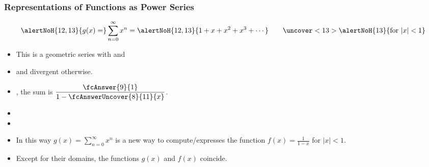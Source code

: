 \begin{frame}
\frametitle{Representations of Functions as Power Series}
\[ \alertNoH{12,13}{g(x)=} \sum_{n=0}^\infty x^n =\alertNoH{12,13}{ 1 + x + x^2 + x^3 + \cdots }\quad \quad  \uncover<13>{\alertNoH{13}{ \text{for } |x|<1}}
\]
\begin{itemize}
\item<2->  This is a geometric series with  and 
\item<6->   and divergent otherwise.
\item<8->  , the sum is $\displaystyle  \frac{ \fcAnswer{9}{ 1} }{1 - \fcAnswerUncover{8}{11}{x}} $.
\item<12->   
\item<14->  


\item<16->  In this way $g(x)=\sum\limits_{n=0}^\infty x^n$ is a new way to compute/expresses the function $\displaystyle f(x) = \frac{1}{1-x}$ for $|x|<1$.
\item<17-> Except for their domains, the functions $g(x)$ and $f(x)$ coincide.  
\end{itemize}
\end{frame}

